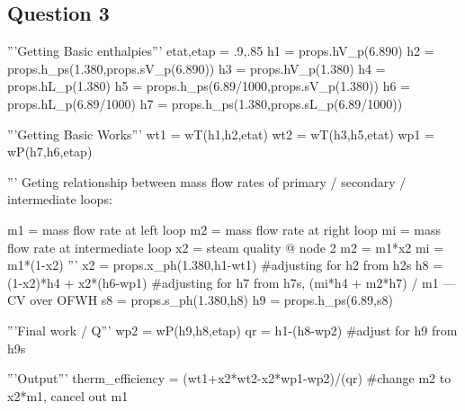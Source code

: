 \documentclass{article}
\begin{document}
\newpage
\subsection*{Question 3}\label{sec:q3code}

\begin{python}
    '''Getting Basic enthalpies'''
    etat,etap = .9,.85
    h1 = props.hV_p(6.890)
    h2 = props.h_ps(1.380,props.sV_p(6.890))
    h3 = props.hV_p(1.380)
    h4 = props.hL_p(1.380)
    h5 = props.h_ps(6.89/1000,props.sV_p(1.380))
    h6 = props.hL_p(6.89/1000)
    h7 = props.h_ps(1.380,props.sL_p(6.89/1000))
    
    '''Getting Basic Works'''
    wt1 = wT(h1,h2,etat)
    wt2 = wT(h3,h5,etat)
    wp1 = wP(h7,h6,etap)
    
    '''
    Geting relationship between mass flow rates of
    primary / secondary / intermediate loops:
    
    m1 = mass flow rate at left loop 
    m2 = mass flow rate at right loop 
    mi = mass flow rate at intermediate loop 
    x2 = steam quality @ node 2
    m2 = m1*x2
    mi = m1*(1-x2)
    '''
    x2 = props.x_ph(1.380,h1-wt1) #adjusting for h2 from h2s
    h8 = (1-x2)*h4 + x2*(h6-wp1) #adjusting for h7 from h7s, (mi*h4 + m2*h7) / m1 --- CV over OFWH 
    s8 = props.s_ph(1.380,h8)
    h9 = props.h_ps(6.89,s8)
    
    '''Final work / Q'''
    wp2 = wP(h9,h8,etap)
    qr = h1-(h8-wp2) #adjust for h9 from h9s
    
    '''Output'''
    therm_efficiency = (wt1+x2*wt2-x2*wp1-wp2)/(qr) #change m2 to x2*m1, cancel out m1
\end{python}
\end{document}
